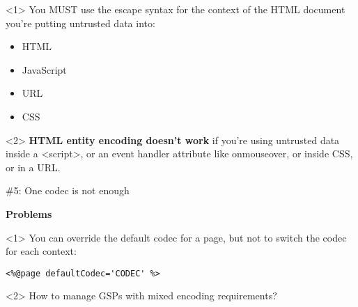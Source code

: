 {\begin{frame}
    \begin{onlyenv}<1>
      You MUST use the escape syntax for the context of the HTML document you're putting untrusted data into:
      \begin{itemize}
        \item HTML
        \item JavaScript
        \item URL
        \item CSS
      \end{itemize}
    \end{onlyenv}

    \begin{onlyenv}<2>
      \textbf{HTML entity encoding doesn't work} if you're using untrusted data inside a <script>, or an event handler attribute like onmouseover, or inside CSS, or in a URL.
    \end{onlyenv}

\end{frame}


\begin{frame}

    \vspace{.5cm}

    \begin{center}
      \Huge\color{red} \#5: One codec is not enough
    \end{center}

    \vspace{1cm}

    \Large
    \textbf{Problems} \\[1em]

    \begin{onlyenv}<1>
      You can override the default codec for a page, but not to switch the codec for each context:
      \begin{center}
        \begin{minipage}{.9\textwidth}
          \begin{verbatim}
<%@page defaultCodec='CODEC' %>
          \end{verbatim}
        \end{minipage}
      \end{center}
    \end{onlyenv}

    \begin{onlyenv}<2>
      How to manage GSPs with mixed encoding requirements?
    \end{onlyenv}


\end{frame}}
